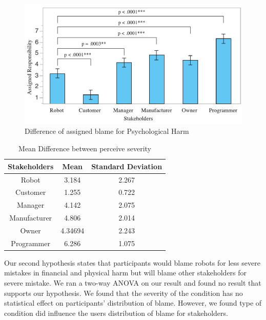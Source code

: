 \documentclass{sigchi}
\begin{document}
\begin{figure}[!h]
\centering
\includegraphics[width=1.0\columnwidth]{psychologicalGraph}
\caption{Difference of assigned blame for Psychological Harm}
\label{fig:figure5}
\end{figure}

\begin{table}[h]
  \centering
  \begin{tabular}{|c|c|c|}
    \hline
    Stakeholders & Mean & Standard Deviation\\
    \hline
    Robot & 3.184 & 2.267\\
    \hline
    Customer & 1.255 & 0.722\\
    \hline
    Manager & 4.142 & 2.075 \\
    \hline
    Manufacturer & 4.806 & 2.014 \\
    \hline
    Owner & 4.34694 & 2.243 \\
    \hline
    Programmer & 6.286 & 1.075 \\
    \hline
  \end{tabular}
  \caption{Mean Difference between perceive severity}
  \label{tab:table2}
\end{table}

Our second hypothesis states that participants would blame robots for less severe mistakes in financial and physical harm but will blame other stakeholders for severe mistake. We ran a two-way ANOVA on our result and found no result that supports our hypothesis. We found that the severity of the condition has no statistical effect on participants' distribution of blame. However, we found type of condition did influence the users distribution of blame for stakeholders. 
\end{document}
